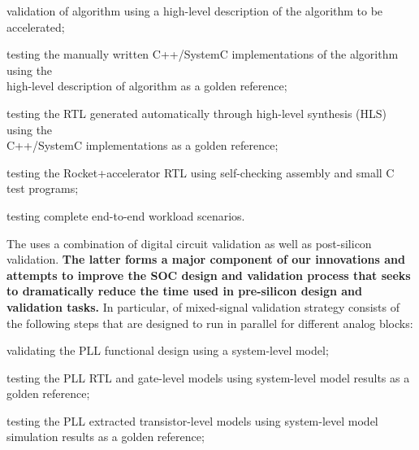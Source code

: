 \begin{cbxlist}{1.5em}{1em}{1em}
    \smallskip
    \begin{cbxlist}[--]{1.5em}{0em}{0em}
      \raggedright

      \item validation of algorithm using a high-level description of the
         algorithm to be accelerated;

      \item testing the manually written C++/SystemC implementations of
         the algorithm using the \\\hspace{0.5em}high-level description
         of algorithm as a golden reference;

      \item testing the RTL generated automatically through high-level
         synthesis (HLS) using the \\\hspace{0.5em}C++/SystemC
         implementations as a golden reference;

      \item testing the Rocket+accelerator RTL using self-checking
         assembly and small C test programs;

      \item testing complete end-to-end workload scenarios.

    \end{cbxlist}

 \item The  uses a combination of digital circuit validation as well as post-silicon validation. {\bf The latter forms a major component of our innovations and attempts to improve the SOC design and validation process that seeks to dramatically reduce the time used in pre-silicon design and validation tasks.} In particular, of mixed-signal validation strategy consists of the following steps that are designed to run in parallel for different analog blocks:

    \smallskip
    \begin{cbxlist}[--]{1.5em}{0em}{0em}
      \raggedright

      \item validating the PLL functional design using a system-level model;

      \item testing the PLL RTL and gate-level models using system-level
         model results as a golden reference;

      \item testing the PLL extracted transistor-level models using
         system-level model simulation results as a golden reference;


\end{cbxlist}
\end{cbxlist}
